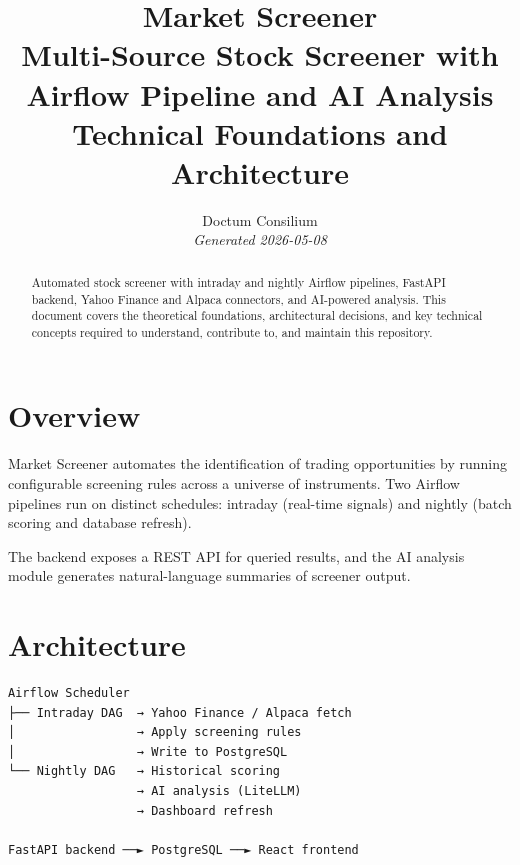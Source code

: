 \documentclass[11pt,a4paper]{article}
\begin{document}
\title{
  \textcolor{doctum}{\Large\textbf{Market Screener}} \\[0.5em]
  \large Multi-Source Stock Screener with Airflow Pipeline and AI Analysis \\[0.3em]
  \normalsize Technical Foundations and Architecture
}
\author{Doctum Consilium \\ \small\textit{Generated 2026-05-08}}
\date{}
\maketitle
\thispagestyle{fancy}

\begin{abstract}
Automated stock screener with intraday and nightly Airflow pipelines, FastAPI backend, Yahoo Finance and Alpaca connectors, and AI-powered analysis.
This document covers the theoretical foundations, architectural decisions,
and key technical concepts required to understand, contribute to, and
maintain this repository.
\end{abstract}

\tableofcontents
\newpage

\section{Overview}

Market Screener automates the identification of trading opportunities by
running configurable screening rules across a universe of instruments.
Two Airflow pipelines run on distinct schedules: intraday (real-time signals)
and nightly (batch scoring and database refresh).

The backend exposes a REST API for queried results, and the AI analysis
module generates natural-language summaries of screener output.


\section{Architecture}

\begin{verbatim}
Airflow Scheduler
├── Intraday DAG  → Yahoo Finance / Alpaca fetch
│                 → Apply screening rules
│                 → Write to PostgreSQL
└── Nightly DAG   → Historical scoring
                  → AI analysis (LiteLLM)
                  → Dashboard refresh

FastAPI backend ──► PostgreSQL ──► React frontend
\end{verbatim}
\end{document}
